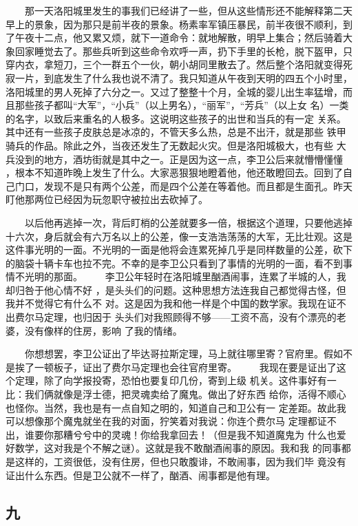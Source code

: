  　　那一天洛阳城里发生的事我们已经讲了一些，但从这些情形还不能解释第二天 早上的景象，因为那只是前半夜的景象。杨素率军镇压暴民，前半夜很不顺利，到 了午夜十二点，他又累又烦，就下一道命令：就地解散，明早上集合；然后骑着大 象回家睡觉去了。那些兵听到这些命令欢呼一声，扔下手里的长枪，脱下盔甲，只 穿内衣，拿短刀，三个一群五个一伙，朝小胡同里散去了。然后整个洛阳就变得死 寂一片，到底发生了什么我也说不清了。我只知道从午夜到天明的四五个小时里， 洛阳城里的男人死掉了六分之一。又过了整整十个月，全城的婴儿出生率猛增，而 且那些孩子都叫“大军”，“小兵”（以上男名），“丽军”，“芳兵”（以上女 名）一类的名字，以致后来重名的人极多。这说明这些孩子的出世和当兵的有一定 关系。其中还有一些孩子皮肤总是冰凉的，不管天多么热，总是不出汗，就是那些 铁甲骑兵的作品。除此之外，当夜还发生了无数起火灾。但是洛阳城极大，也有些 大兵没到的地方，酒坊街就是其中之一。正是因为这一点，李卫公后来就懵懵懂懂 ，根本不知道昨晚上发生了什么。大家恶狠狠地瞪着他，他还敢瞪回去。回到了自 己门口，发现不是只有两个公差，而是四个公差在等着他。而且都是生面孔。昨天 盯他那两位已经因为玩忽职守被拉出去砍掉了。

 　　以后他再逃掉一次，背后盯梢的公差就要多一倍，根据这个道理，只要他逃掉 十六次，身后就会有六万名以上的公差，像一支浩浩荡荡的大军，无比壮观。这是 这件事光明的一面。不光明的一面是他将会连累死掉几乎是同样数量的公差，砍下 的脑袋十辆卡车也拉不完。不幸的是李卫公只看到了事情的光明的一面，看不到事 情不光明的那面。 　　李卫公年轻时在洛阳城里酗酒闹事，连累了半城的人，我却归咎于他心情不好 ，是头头们的问题。这种思想方法连我自己都觉得古怪，但我并不觉得它有什么不 对。这是因为我和他一样是个中国的数学家。我现在证不出费尔马定理，也归因于 头头们对我照顾得不够——工资不高，没有个漂亮的老婆，没有像样的住房，影响 了我的情绪。

 　　你想想罢，李卫公证出了毕达哥拉斯定理，马上就往哪里寄？官府里。假如不 是挨了一顿板子，证出了费尔马定理也会往官府里寄。 　　我现在要是证出了这个定理，除了向学报投寄，恐怕也要复印几份，寄到上级 机关。这件事好有一比：我们俩就像是浮士德，把灵魂卖给了魔鬼。做出了好东西 给你，活得不顺心也怪你。当然，我也是有一点自知之明的，知道自己和卫公有一 定差距。故此我可以想像那个魔鬼就坐在我的对面，狞笑着对我说：你连个费尔马 定理都证不出，谁要你那糟兮兮中的灵魂！你给我拿回去！（但是我不知道魔鬼为 什么也爱好数学，这对我是个不解之谜）。这就是我不敢酗酒闹事的原因。我和我 的同事都是这样的，工资很低，没有住房，但也只敢腹诽，不敢闹事，因为我们毕 竟没有证出什么东西。但是卫公就不一样了，酗酒、闹事都是他有理。 
 
 
\subsection{九} 
 
